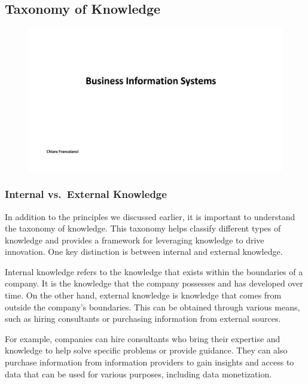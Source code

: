 \subsection{Taxonomy of Knowledge}\label{taxonomy-of-knowledge}

\begin{figure}[!h]
    \centering
    \includegraphics[page=5, trim = 1.5cm 1cm 1.5cm 3cm, clip, width=\textwidth]{images/05 - KM.pdf}
\end{figure}

\subsubsection{Internal vs.~External
    Knowledge}\label{internal-vs.-external-knowledge}

In addition to the principles we discussed earlier, it is important to
understand the taxonomy of knowledge. This taxonomy helps classify
different types of knowledge and provides a framework for leveraging
knowledge to drive innovation. One key distinction is between internal
and external knowledge.

Internal knowledge refers to the knowledge that exists within the
boundaries of a company. It is the knowledge that the company possesses
and has developed over time. On the other hand, external knowledge is
knowledge that comes from outside the company's boundaries. This can be
obtained through various means, such as hiring consultants or purchasing
information from external sources.

For example, companies can hire consultants who bring their expertise
and knowledge to help solve specific problems or provide guidance. They
can also purchase information from information providers to gain
insights and access to data that can be used for various purposes,
including data monetization.

